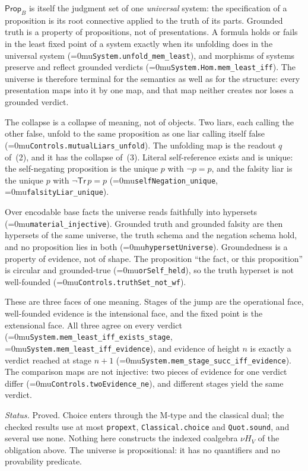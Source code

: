 \documentclass[11pt]{article}
\newcommand{\leanname}[1]{\textup{\Urlmuskip=0mu\relax\nolinkurl{#1}}}
\theoremstyle{definition}
\theoremstyle{remark}
\begin{document}
$\mathsf{Prop}_B$ is itself the judgment set of one \emph{universal} system: the
specification of a proposition is its root connective applied to the truth of
its parts.  Grounded truth is a property of propositions, not of presentations.
A formula holds or fails in the least fixed point of a system exactly when its
unfolding does in the universal system (\leanname{System.unfold_mem_least}), and
morphisms of systems preserve and reflect grounded verdicts
(\leanname{System.Hom.mem_least_iff}).  The universe is therefore terminal for
the semantics as well as for the structure: every presentation maps into it by
one map, and that map neither creates nor loses a grounded verdict.

The collapse is a collapse of meaning, not of objects.  Two liars, each calling
the other false, unfold to the same proposition as one liar calling itself false
(\leanname{Controls.mutualLiars_unfold}).  The unfolding map is the readout $q$
of~(2), and it has the collapse of~(3).  Literal self-reference exists and is
unique: the self-negating proposition is the unique $p$ with $\neg p=p$, and the
falsity liar is the unique $p$ with $\neg\mathsf{Tr}\,p=p$
(\leanname{selfNegation_unique}, \leanname{falsityLiar_unique}).

Over encodable base facts the universe reads faithfully into hypersets
(\leanname{material_injective}).  Grounded truth and grounded falsity are then
hypersets of the same universe, the truth schema and the negation schema hold,
and no proposition lies in both
(\leanname{hypersetUniverse}).  Groundedness is a property of evidence, not of
shape.  The proposition ``the fact, or this proposition'' is circular and
grounded-true (\leanname{orSelf_held}), so the truth hyperset is not
well-founded (\leanname{Controls.truthSet_not_wf}).

These are three faces of one meaning.  Stages of the jump are the operational
face, well-founded evidence is the intensional face, and the fixed point is the
extensional face.  All three agree on every verdict
(\leanname{System.mem_least_iff_exists_stage}, \leanname{System.mem_least_iff_evidence}),
and evidence of height $n$ is exactly a verdict reached at stage $n+1$
(\leanname{System.mem_stage_succ_iff_evidence}).  The comparison maps are not
injective: two pieces of evidence for one verdict differ
(\leanname{Controls.twoEvidence_ne}), and different stages yield the same verdict.

\emph{Status.}  Proved.  Choice enters through the M-type and the classical
dual; the checked results use at most \texttt{propext},
\texttt{Classical.choice} and \texttt{Quot.sound}, and several use none.
Nothing here constructs the indexed coalgebra $\nu H_V$ of the obligation above.
The universe is propositional: it has no quantifiers and no provability
predicate.
\end{document}
